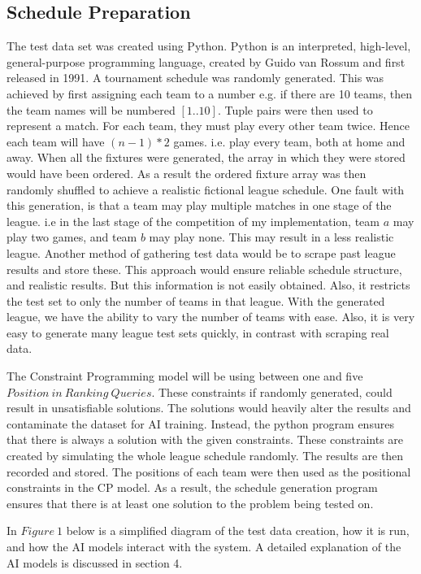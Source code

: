 \documentclass{article}
\begin{document}
	\subsection{Schedule Preparation}
	The test data set was created using Python. Python is an interpreted, high-level, general-purpose programming language, created by Guido van Rossum and first released in 1991. A tournament schedule was randomly generated. This was achieved by first assigning each team to a number e.g. if there are 10 teams, then the team names will be numbered \([1..10]\). Tuple pairs were then used to represent a match. For each team, they must play every other team twice. Hence each team will have \((n-1)*2\) games. i.e. play every team, both at home and away. When all the fixtures were generated, the array in which they were stored would have been ordered. As a result the ordered fixture array was then randomly shuffled to achieve a realistic fictional league schedule. One fault with this generation, is that a team may play multiple matches in one stage of the league. i.e in the last stage of the competition of my implementation, team \(a\) may play two games, and team \(b\) may play none. This may result in a less realistic league. Another method of gathering test data would be to scrape past league results and store these. This approach would ensure reliable schedule structure, and realistic results. But this information is not easily obtained. Also, it restricts the test set to only the number of teams in that league. With the generated league, we have the ability to vary the number of teams with ease. Also, it is very easy to generate many league test sets quickly, in contrast with scraping real data.
	
	The Constraint Programming model will be using between one and five \(Position\ in\ Ranking\ Queries \). These constraints if randomly generated, could result in unsatisfiable solutions. The solutions would heavily alter the results and contaminate the dataset for AI training. Instead, the python program ensures that there is always a solution with the given constraints.
	These constraints are created by simulating the whole league schedule randomly. The results are then recorded and stored. The positions of each team were then used as the positional constraints in the CP model. As a result, the schedule generation program ensures that there is at least one solution to the problem being tested on. 
	
	In \(Figure\ 1\) below is a simplified diagram of the test data creation, how it is run, and how the AI models interact with the system. A detailed explanation of the AI models is discussed in section 4. 
	
\end{document}
